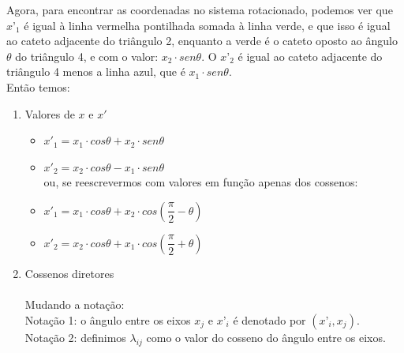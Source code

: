 \documentclass[12pt,a4paper]{article}
\begin{document}
Agora, para encontrar as coordenadas no sistema rotacionado, podemos ver que $x’_1$ é igual à linha vermelha pontilhada somada à linha verde, e que isso é igual ao cateto adjacente do triângulo 2, enquanto a verde é o cateto oposto ao ângulo $\theta$ do triângulo 4, e com o valor: $x_2 \cdot sen\theta$. O $x’_2$ é igual ao cateto adjacente do triângulo 4 menos a linha azul, que é $x_1 \cdot sen\theta$.\\

Então temos:


\renewcommand{\labelitemii}{$\square$} %

\begin{enumerate}


    \item Valores de $x$ e $x'$
    
        \begin{itemize}
            \item $x'_1 = x_1 \cdot cos\theta + x_2 \cdot sen\theta$
            \item $x'_2 = x_2 \cdot cos\theta - x_1 \cdot sen\theta$\\
            ou, se reescrevermos com valores em função apenas dos cossenos:
            \item  \hspace{0.1cm} $x'_1 = x_1 \cdot cos\theta + x_2 \cdot cos(\dfrac{\pi}{2} - \theta)$
            \item \hspace{0.1cm} $x'_2 = x_2 \cdot cos\theta + x_1 \cdot cos(\dfrac{\pi}{2} + \theta)$
        \end{itemize}


    
    \item Cossenos diretores\\\\
    Mudando a notação:\\
    Notação 1: o ângulo entre os eixos $x_j$ e $x’_i$ é denotado por $(x’_i,x_j)$.\\
    Notação 2: definimos $\lambda_{ij}$ como o valor do cosseno do ângulo entre os eixos.

        
        \begin{itemize}
        

\end{itemize}
\end{enumerate}
\end{document}
